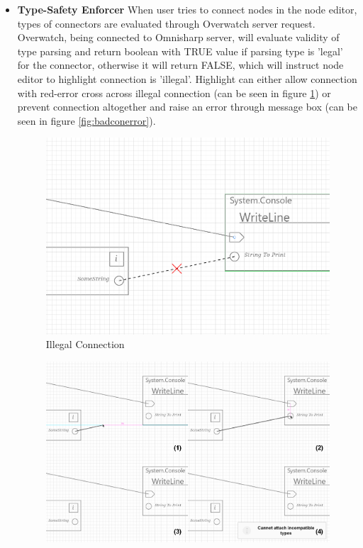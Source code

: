 \documentclass{article}
\begin{document}
\begin{itemize}
    \item \textbf{Type-Safety Enforcer} \newline
    When user tries to connect nodes in the node editor, types of connectors are evaluated through Overwatch server request. Overwatch, being connected to Omnisharp server, will evaluate validity of type parsing and return boolean with TRUE value if parsing type is 'legal' for the connector, otherwise it will return FALSE, which will instruct node editor to highlight connection is 'illegal'. Highlight can either allow connection with red-error cross across illegal connection (can be seen in figure \ref{fig:badcon}) or prevent connection altogether and raise an error through message box (can be seen in figure \ref{fig:badconerror}).
    \begin{figure}[H]
        \centering
        \includegraphics[width=1\textwidth]{Capture.PNG}
        \caption{Illegal Connection}
        \label{fig:badcon}
    \end{figure}
    \begin{figure}[H]
        \centering
        \includegraphics[width=1\textwidth]{illegalmove.png}

\end{figure}
\end{itemize}
\end{document}
